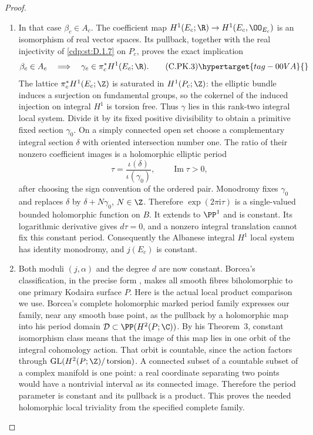 \begin{proof}
\begin{enumerate}[label={$\langle1\rangle$\arabic*.},leftmargin=*]
\item In that case $\beta_c\in A_c$. The coefficient map
$H^1(E_c;\R)\to H^1(E_c,\OO_{E_c})$ is an isomorphism
of real vector spaces. Its pullback, together with the real
injectivity of \ref{cdp:st:D.1.7} on $P_c$, proves the exact implication
\[
 \beta_c\in A_c
 \quad\Longrightarrow\quad
 \gamma_c\in\pi_c^*H^1(E_c;\R).
\tag{C.PK.3}\hypertarget{tag-00VA}{}\label{cdp:eq:C.PK.3}
\]
The lattice $\pi_c^*H^1(E_c;\Z)$ is saturated in
$H^1(P_c;\Z)$: the elliptic bundle induces a surjection
on fundamental groups, so the cokernel of the induced
injection on integral $H^1$ is torsion free. Thus $\gamma$
lies in this rank-two integral local system. Divide it by
its fixed positive divisibility to obtain a primitive fixed
section $\gamma_0$. On a simply connected open set choose
a complementary integral section $\delta$ with oriented
intersection number one. The ratio of their nonzero
coefficient images is a holomorphic elliptic period
\[
 \tau=\frac{\iota(\delta)}{\iota(\gamma_0)},
 \qquad \operatorname{Im}\tau>0,
\]
after choosing the sign convention of the ordered pair.
Monodromy fixes $\gamma_0$ and replaces $\delta$ by
$\delta+N\gamma_0$, $N\in\Z$. Therefore
$\exp(2\pi\mathrm i\tau)$ is a single-valued bounded
holomorphic function on $B$. It extends to $\PP^1$ and
is constant. Its logarithmic derivative gives $d\tau=0$,
and a nonzero integral translation cannot fix this constant
period. Consequently the Albanese integral $H^1$ local
system has identity monodromy, and $j(E_c)$ is constant.

\item Both moduli $(j,\alpha)$ and the degree $d$ are now
constant. Borcea's classification, in the precise form
\cite[\S1]{SS2002}, makes all smooth fibres biholomorphic
to one primary Kodaira surface $P$. Here is the actual
local product comparison we use. Borcea's complete
holomorphic marked period family \cite[Remark~1]{Borcea1984}
expresses our family, near any smooth base point, as the
pullback by a holomorphic map into his period domain
$\mathcal D\subset\PP(H^2(P;\C))$. By his Theorem~3,
constant isomorphism class means that the image of this
map lies in one orbit of the integral cohomology action.
That orbit is countable, since the action factors through
$\operatorname{GL}(H^2(P;\Z)/\operatorname{torsion})$.
A connected subset of a countable subset of a complex
manifold is one point: a real coordinate separating two
points would have a nontrivial interval as its connected
image. Therefore the period parameter is constant and
its pullback is a product. This proves the needed
holomorphic local triviality from the specified complete
family.


\end{enumerate}
\end{proof}
